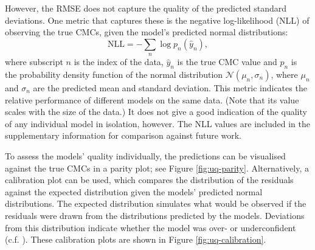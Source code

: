 However, the RMSE does not capture the quality of the predicted standard deviations. One metric that captures these is the negative log-likelihood (NLL) of observing the true CMCs, given the model's predicted normal distributions:
\begin{equation}
    \text{NLL} = -\sum_n \log p_n(\hat{y}_n),
\end{equation}
where subscript $n$ is the index of the data, $\hat{y}_n$ is the true CMC value and $p_n$ is the probability density function of the normal distribution $\mathcal{N}(\mu_n, \sigma_n)$, where $\mu_n$ and $\sigma_n$ are the predicted
mean and standard deviation. This metric indicates the relative performance of different models on the same data. (Note that its value scales with the size of the data.) It does not give a good indication of the quality of any individual
model in isolation, however. The NLL values are included in the supplementary information for comparison against future work.

To assess the models' quality individually, the predictions can be visualised against the true CMCs in a parity plot; see Figure \ref{fig:uq-parity}. Alternatively, a calibration plot can be used, which compares the distribution of the residuals against the expected distribution given the models' predicted normal distributions. The expected distribution simulates what would be observed if the residuals were drawn from the distributions predicted by the models.
Deviations from this distribution indicate whether the model was over- or underconfident (c.f. \citet{tranMethodsComparingUncertainty2020}). These calibration plots are shown in Figure \ref{fig:uq-calibration}.


